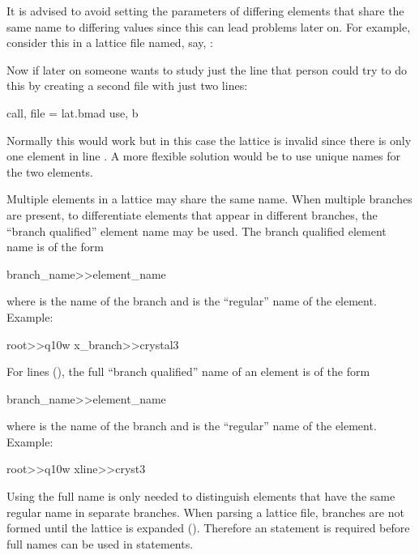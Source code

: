 {{{{{It is advised to avoid setting the parameters of differing elements that share the same
name to differing values since this can lead problems later on. For example, consider this in a
lattice file named, say, :
Now if later on someone wants to study just the  line that person could try to do this by
creating a second file with just two lines:
\begin{example}
  call, file = lat.bmad
  use, b
\end{example}
Normally this would work but in this case the lattice is invalid since there is only one 
element in line . A more flexible solution would be to use unique names for the two 
elements.

Multiple elements in a lattice may share the same name.  When multiple branches are present, to
differentiate elements that appear in different branches, the ``branch qualified'' element name may
be used. The branch qualified element name is of the form
\begin{example}
  branch_name>>element_name
\end{example}
where  is the name of the branch and  is the ``regular'' name of
the element. Example:
\begin{example}
  root>>q10w
  x_branch>>crystal3
\end{example}

For  lines (), the full ``branch qualified'' name of an element is of
the form
\begin{example}
  branch_name>>element_name
\end{example}
where  is the name of the branch and  is the ``regular'' name of
the element. Example:
\begin{example}
  root>>q10w
  xline>>cryst3
\end{example}
Using the full name is only needed to distinguish elements that have the same regular name in
separate branches. When parsing a lattice file, branches are not formed until the lattice is
expanded (). Therefore an  statement is required before full names
can be used in statements.

}}}}}

